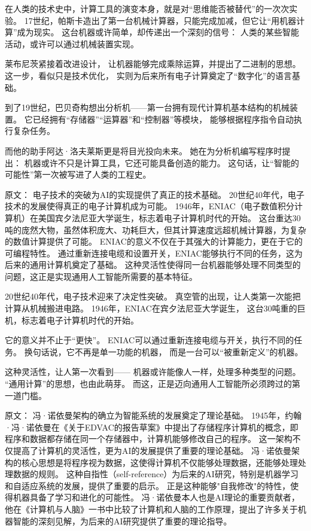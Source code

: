 在人类的技术史中，计算工具的演变本身，就是对“思维能否被替代”的一次次实验。
17世纪，帕斯卡造出了第一台机械计算器，只能完成加减，但它让“用机器计算”成为现实。
这台机器或许简单，却传递出一个深刻的信号：
人类的某些智能活动，或许可以通过机械装置实现。

莱布尼茨紧接着改进设计，
让机器能够完成乘除运算，并提出了二进制的思想。
这一步，看似只是技术优化，
实则为后来所有电子计算奠定了“数字化”的语言基础。

到了19世纪，巴贝奇构想出分析机——第一台拥有现代计算机基本结构的机械装置。
它已经拥有“存储器”“运算器”和“控制器”等模块，
能够根据程序指令自动执行复杂任务。

而他的助手阿达·洛夫莱斯更是将目光投向未来。
她在为分析机编写程序时提出：
机器或许不只是计算工具，它还可能具备创造的能力。
这句话，让“智能的可能性”第一次被写进了人类的工程史。

原文：
电子技术的突破为AI的实现提供了真正的技术基础。
20世纪40年代，电子技术的发展使得真正的电子计算机成为可能。
1946年，ENIAC（电子数值积分计算机）在美国宾夕法尼亚大学诞生，标志着电子计算机时代的开始。
这台重达30吨的庞然大物，虽然体积庞大、功耗巨大，但其计算速度远超机械计算器，为复杂的数值计算提供了可能。
ENIAC的意义不仅在于其强大的计算能力，更在于它的可编程特性。
通过重新连接电缆和设置开关，ENIAC能够执行不同的任务，这为后来的通用计算机奠定了基础。
这种灵活性使得同一台机器能够处理不同类型的问题，这正是实现通用人工智能所需要的基本特征。


20世纪40年代，电子技术迎来了决定性突破。
真空管的出现，让人类第一次能把计算从机械搬进电路。
1946年，ENIAC在宾夕法尼亚大学诞生，
这台30吨重的巨机，标志着电子计算机时代的开始。

它的意义并不止于“更快”。
ENIAC可以通过重新连接电缆与开关，执行不同的任务。
换句话说，它不再是单一功能的机器，
而是一台可以“被重新定义”的机器。

这种灵活性，让人第一次看到——
机器或许能像人一样，处理多种类型的问题。
“通用计算”的思想，也由此萌芽。
而这，正是迈向通用人工智能所必须跨过的第一道门槛。

原文：
冯·诺依曼架构的确立为智能系统的发展奠定了理论基础。
1945年，约翰·冯·诺依曼在《关于EDVAC的报告草案》中提出了存储程序计算机的概念，即程序和数据都存储在同一个存储器中，计算机能够修改自己的程序。
这一架构不仅提高了计算机的灵活性，更为AI的发展提供了重要的理论基础。
冯·诺依曼架构的核心思想是将程序视为数据，这使得计算机不仅能够处理数据，还能够处理处理数据的规则。
这种自指性（self-reference）为后来的AI研究，特别是机器学习和自适应系统的发展，提供了重要的启示。
正是这种能够"自我修改"的特性，使得机器具备了学习和进化的可能性。
冯·诺依曼本人也是AI理论的重要贡献者，他在《计算机与人脑》一书中比较了计算机和人脑的工作原理，提出了许多关于机器智能的深刻见解，为后来的AI研究提供了重要的理论指导。

